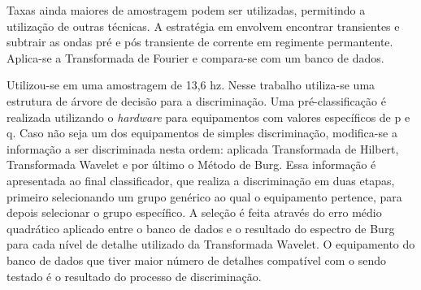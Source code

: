 Taxas ainda maiores de amostragem podem ser utilizadas, permitindo a utilização
de outras técnicas. A estratégia em \cite{nilm_laughman} envolvem encontrar transientes e subtrair as
ondas pré e pós transiente de corrente em regimente permantente. Aplica-se a
Transformada de Fourier e compara-se com um banco de dados. 

Utilizou-se em \cite{nascimento} uma amostragem de 13,6
\acrshort{hz}. Nesse trabalho utiliza-se uma estrutura de árvore de decisão para
a discriminação. Uma pré-classificação é realizada utilizando o \emph{hardware}
para equipamentos com valores específicos de \gls{p} e \gls{q}. Caso não seja um
dos equipamentos de simples discriminação, modifica-se a informação a ser
discriminada nesta ordem: aplicada Transformada de Hilbert, Transformada Wavelet
e por último o Método de Burg. Essa informação é apresentada ao final classificador, que
realiza a discriminação em duas etapas, primeiro selecionando um grupo genérico
ao qual o equipamento pertence, para depois selecionar o grupo específico. A
seleção é feita através do erro médio quadrático aplicado entre o banco de dados
e o resultado do espectro de Burg para cada nível de detalhe utilizado da
Transformada Wavelet. O equipamento do banco de dados que tiver maior número de 
detalhes compatível com o sendo testado é o resultado do processo de
discriminação.









